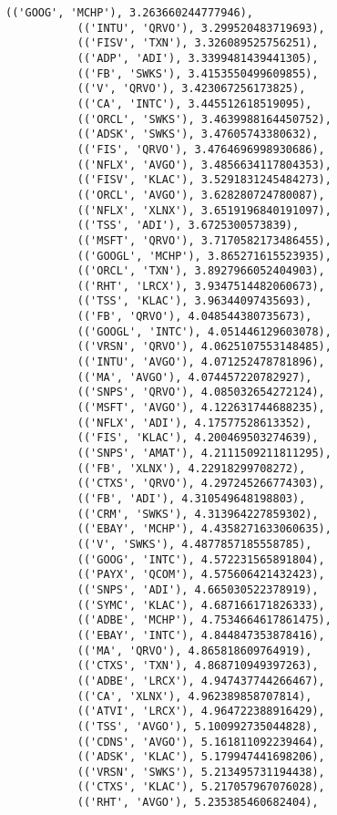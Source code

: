 \documentclass[11pt]{article}
\begin{document}
\begin{Verbatim}[commandchars=\\\{\}]
           (('GOOG', 'MCHP'), 3.263660244777946),
           (('INTU', 'QRVO'), 3.299520483719693),
           (('FISV', 'TXN'), 3.326089525756251),
           (('ADP', 'ADI'), 3.3399481439441305),
           (('FB', 'SWKS'), 3.4153550499609855),
           (('V', 'QRVO'), 3.423067256173825),
           (('CA', 'INTC'), 3.445512618519095),
           (('ORCL', 'SWKS'), 3.4639988164450752),
           (('ADSK', 'SWKS'), 3.47605743380632),
           (('FIS', 'QRVO'), 3.4764696998930686),
           (('NFLX', 'AVGO'), 3.4856634117804353),
           (('FISV', 'KLAC'), 3.5291831245484273),
           (('ORCL', 'AVGO'), 3.628280724780087),
           (('NFLX', 'XLNX'), 3.6519196840191097),
           (('TSS', 'ADI'), 3.6725300573839),
           (('MSFT', 'QRVO'), 3.7170582173486455),
           (('GOOGL', 'MCHP'), 3.865271615523935),
           (('ORCL', 'TXN'), 3.8927966052404903),
           (('RHT', 'LRCX'), 3.9347514482060673),
           (('TSS', 'KLAC'), 3.96344097435693),
           (('FB', 'QRVO'), 4.048544380735673),
           (('GOOGL', 'INTC'), 4.051446129603078),
           (('VRSN', 'QRVO'), 4.0625107553148485),
           (('INTU', 'AVGO'), 4.071252478781896),
           (('MA', 'AVGO'), 4.074457220782927),
           (('SNPS', 'QRVO'), 4.085032654272124),
           (('MSFT', 'AVGO'), 4.122631744688235),
           (('NFLX', 'ADI'), 4.17577528613352),
           (('FIS', 'KLAC'), 4.200469503274639),
           (('SNPS', 'AMAT'), 4.2111509211811295),
           (('FB', 'XLNX'), 4.22918299708272),
           (('CTXS', 'QRVO'), 4.297245266774303),
           (('FB', 'ADI'), 4.310549648198803),
           (('CRM', 'SWKS'), 4.313964227859302),
           (('EBAY', 'MCHP'), 4.4358271633060635),
           (('V', 'SWKS'), 4.4877857185558785),
           (('GOOG', 'INTC'), 4.572231565891804),
           (('PAYX', 'QCOM'), 4.575606421432423),
           (('SNPS', 'ADI'), 4.665030522378919),
           (('SYMC', 'KLAC'), 4.687166171826333),
           (('ADBE', 'MCHP'), 4.7534664617861475),
           (('EBAY', 'INTC'), 4.844847353878416),
           (('MA', 'QRVO'), 4.865818609764919),
           (('CTXS', 'TXN'), 4.868710949397263),
           (('ADBE', 'LRCX'), 4.947437744266467),
           (('CA', 'XLNX'), 4.962389858707814),
           (('ATVI', 'LRCX'), 4.964722388916429),
           (('TSS', 'AVGO'), 5.100992735044828),
           (('CDNS', 'AVGO'), 5.161811092239464),
           (('ADSK', 'KLAC'), 5.179947441698206),
           (('VRSN', 'SWKS'), 5.213495731194438),
           (('CTXS', 'KLAC'), 5.217057967076028),
           (('RHT', 'AVGO'), 5.235385460682404),

\end{Verbatim}
\end{document}
